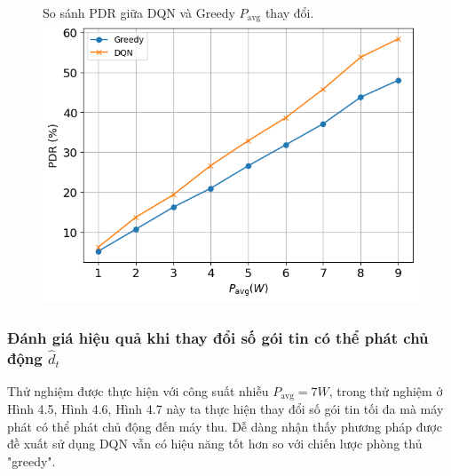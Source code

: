 \documentclass{uetgraduation}
\begin{document}
\begin{figure}{So sánh PDR giữa DQN và Greedy $P_\text{avg}$ thay đổi.}
    \centering
    \includegraphics[scale=0.8]{p_avg_pdr}
    \label{fig:p_avg_pdr}
\end{figure}

\subsubsection{Đánh giá hiệu quả khi thay đổi số gói tin có thể phát chủ động $\hat{d}_t$}
Thử nghiệm được thực hiện với công suất nhiễu $P_\text{avg} = 7W$, trong thử nghiệm ở Hình 4.5, Hình 4.6, Hình 4.7 này ta thực hiện thay đổi số gói tin tối đa mà máy phát
có thể phát chủ động đến máy thu. Dễ dàng nhận thấy phương pháp được đề xuất sử dụng DQN vẫn có hiệu năng tốt hơn so với chiến lược phòng thủ "greedy".
\end{document}
